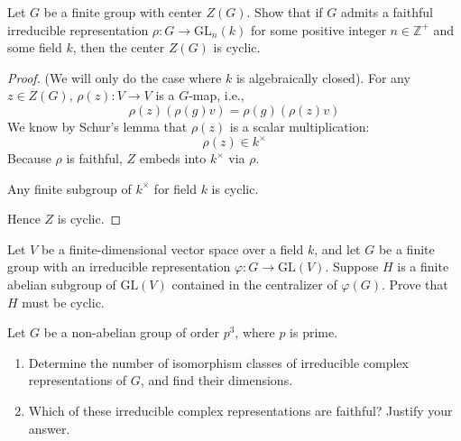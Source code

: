 \begin{prob}[F2017-Q6]
    Let \( G \) be a finite group with center \( Z(G) \). Show that if \( G \) admits a faithful irreducible representation \( \rho \colon G \to \mathrm{GL}_n(k) \) for some positive integer \( n \in \mathbb{Z}^+ \) and some field \( k \), then the center \( Z(G) \) is cyclic.
\end{prob}
\begin{proof}
    (We will only do the case where $k$ is algebraically closed). For any $z\in Z(G)$, $\rho(z): V\to V$ is a $G$-map, i.e., 
    \begin{equation*}
        \rho(z)(\rho(g)v)=\rho(g)(\rho(z)v)
    \end{equation*}
    We know by Schur's lemma that $\rho(z)$ is a scalar multiplication: 
    \begin{equation*}
        \rho(z)\in k^\times
    \end{equation*}
    Because $\rho$ is faithful, $Z$ embeds into $k^\times$ via $\rho$. 
    \begin{lem}[Fact]
        Any finite subgroup of $k^\times$ for field $k$ is cyclic.
    \end{lem}
    Hence $Z$ is cyclic.
\end{proof}


\begin{prob}[S2005-Q6]
    Let \( V \) be a finite-dimensional vector space over a field \( k \), and let \( G \) be a finite group with an irreducible representation \( \varphi \colon G \to \mathrm{GL}(V) \). Suppose \( H \) is a finite abelian subgroup of \( \mathrm{GL}(V) \) contained in the centralizer of \( \varphi(G) \). Prove that \( H \) must be cyclic.
\end{prob}



\begin{prob}[F2010-Q6]
    Let \( G \) be a non-abelian group of order \( p^3 \), where \( p \) is prime.
    
    \begin{enumerate}
        \item Determine the number of isomorphism classes of irreducible complex representations of \( G \), and find their dimensions.
        
        \item Which of these irreducible complex representations are faithful? Justify your answer.
    \end{enumerate}
\end{prob}



